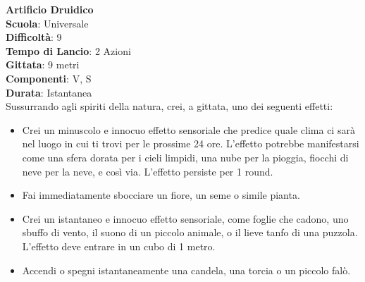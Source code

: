 \begin{multicols}{2}
\medskip\textbf{Artificio Druidico}\\
\textbf{Scuola}: Universale\\
\textbf{Difficoltà}: 9\\
\textbf{Tempo di Lancio}: 2 Azioni\\
\textbf{Gittata}: 9 metri\\
\textbf{Componenti}: V, S\\
\textbf{Durata}: Istantanea\\
Sussurrando agli spiriti della natura, crei, a gittata, uno dei seguenti effetti:
\begin{itemize}
\item
Crei un minuscolo e innocuo effetto sensoriale che predice quale clima ci sarà nel luogo in cui ti trovi per le prossime 24 ore. L'effetto potrebbe manifestarsi come una sfera dorata per i cieli limpidi, una nube per la pioggia, fiocchi di neve per la neve, e così via. L'effetto persiste per 1 round.
\item 
Fai immediatamente sbocciare un fiore, un seme o simile pianta.
\item 
Crei un istantaneo e innocuo effetto sensoriale, come foglie che cadono, uno sbuffo di vento, il suono di un piccolo animale, o il lieve tanfo di una puzzola. L'effetto deve entrare in un cubo di 1 metro.
\item Accendi o spegni istantaneamente una candela, una torcia o un piccolo falò.
\end{itemize}


\end{multicols}

